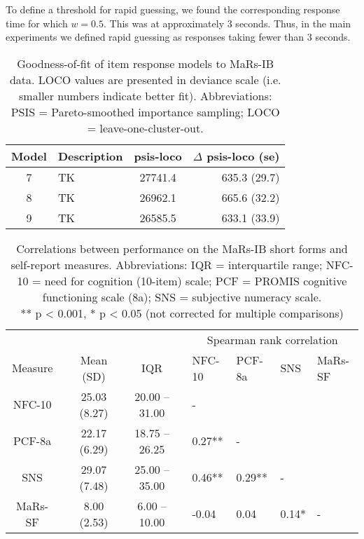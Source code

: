 \documentclass[a4paper,man,natbib]{apa6}
\begin{document}
To define a threshold for rapid guessing, we found the corresponding response time for which $w = 0.5$. This was at approximately 3 seconds. Thus, in the main experiments we defined rapid guessing as responses taking fewer than 3 seconds. 



\begin{table}
    \centering
    \begin{tabular*}{\textwidth}{clcr}
    \toprule
    Model & Description & psis-loco & $\Delta$ psis-loco (se) \\
    \midrule
    7 & TK  & 27741.4 & 635.3 (29.7) \\
    8 & TK  & 26962.1 & 665.6 (32.2) \\
    9 & TK & 26585.5 & 633.1 (33.9) \\
    \bottomrule
    \end{tabular*}
    \caption{\label{tab:2}\normalfont Goodness-of-fit of item response models to MaRs-IB data. LOCO values are presented in deviance scale (i.e. smaller numbers indicate better fit). Abbreviations: PSIS = Pareto-smoothed importance sampling; LOCO = leave-one-cluster-out.}
    \label{table:2}
\end{table}

\begin{table}
\centering
\begin{tabular*}{\textwidth}{ccccccllll}
\toprule
 & & & & & & \multicolumn{4}{c}{Spearman rank correlation} \\
\cmidrule(lr){7-10}
Measure & & Mean (SD) & & IQR & &  NFC-10 & PCF-8a & SNS & MaRs-SF \\
\midrule
NFC-10 & & 25.03 (8.27) & & 20.00 -- 31.00 & & - &  &  & \\
PCF-8a   &  & 22.17 (6.29) & & 18.75 -- 26.25 & & 0.27** &  - &  &  \\
SNS   &  & 29.07 (7.48) & & 25.00 -- 35.00 & & 0.46** &  0.29** &  - &   \\
MaRs-SF & &   8.00 (2.53) & &   6.00 -- 10.00 & & -0.04 &  0.04 &  0.14* &  - \\
\bottomrule
\end{tabular*}
\captionsetup{width=1.\textwidth}
\caption{\normalfont Correlations between performance on the MaRs-IB short forms and self-report measures. Abbreviations: IQR = interquartile range; NFC-10 = need for cognition (10-item) scale; PCF = PROMIS cognitive functioning scale (8a); SNS = subjective numeracy scale. \\ ** p < 0.001,  * p < 0.05 (not corrected for multiple comparisons)}
\end{table}
\end{document}
